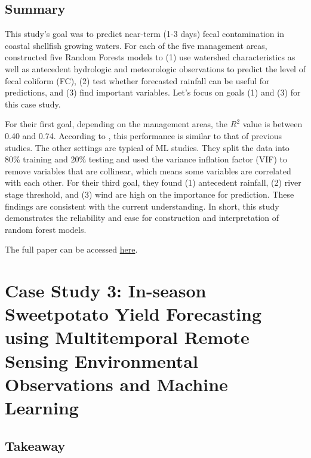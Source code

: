 \documentclass[
]{book}
\begin{document}
\hypertarget{summary-1}{%
\subsection{Summary}\label{summary-1}}

This study's goal was to predict near-term (1-3 days) fecal contamination in coastal shellfish growing waters. For each of the five management areas, \citet{chazal2024} constructed five Random Forests models to (1) use watershed characteristics as well as antecedent hydrologic and meteorologic observations to predict the level of fecal coliform (FC), (2) test whether forecasted rainfall can be useful for predictions, and (3) find important variables. Let's focus on goals (1) and (3) for this case study.

For their first goal, depending on the management areas, the \(R^2\) value is between 0.40 and 0.74. According to \citet{chazal2024}, this performance is similar to that of previous studies. The other settings are typical of ML studies. They split the data into 80\% training and 20\% testing and used the variance inflation factor (VIF) to remove variables that are collinear, which means some variables are correlated with each other. For their third goal, they found (1) antecedent rainfall, (2) river stage threshold, and (3) wind are high on the importance for prediction. These findings are consistent with the current understanding. In short, this study demonstrates the reliability and ease for construction and interpretation of random forest models.

The full paper can be accessed \href{https://www.sciencedirect.com/science/article/pii/S0025326X24000304?via\%3Dihub}{here}.

\hypertarget{case-study-3-in-season-sweetpotato-yield-forecasting-using-multitemporal-remote-sensing-environmental-observations-and-machine-learning}{%
\section{Case Study 3: In-season Sweetpotato Yield Forecasting using Multitemporal Remote Sensing Environmental Observations and Machine Learning}\label{case-study-3-in-season-sweetpotato-yield-forecasting-using-multitemporal-remote-sensing-environmental-observations-and-machine-learning}}

\hypertarget{takeaway-2}{%
\subsection{Takeaway}\label{takeaway-2}}
\end{document}
